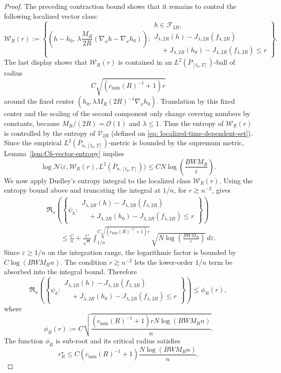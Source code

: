 \documentclass[11pt]{article}
\theoremstyle{plain}
\theoremstyle{definition}
\theoremstyle{remark}
\begin{document}
\begin{proof}
The preceding contraction bound shows that it remains to control the
following localized vector class:
\[
\mathcal W_R(r):=
\left\{
\left(h-h_0,\,
\lambda\frac{M_R}{2R}(\nabla_xh-\nabla_xh_0)\right):
\begin{array}{l}
h\in\mathcal F_{2R},\\
J_{\lambda,2R}(h)-J_{\lambda,2R}(f_{\lambda,2R})\\
\quad+J_{\lambda,2R}(h_0)-J_{\lambda,2R}(f_{\lambda,2R})\le r
\end{array}
\right\}.
\]
The last display shows that \(\mathcal W_R(r)\) is contained in an
\(L^2(\overline P_{[t_0,T]})\)-ball of radius
\[
C\sqrt{(c_{\min}(R)^{-1}+1)r}
\]
around the fixed center \((h_0,\lambda M_R(2R)^{-1}\nabla_xh_0)\). Translation
by this fixed center and the scaling of the second component only change
covering numbers by constants, because \(M_R/(2R)=\mathcal O(1)\) and
\(\lambda\le1\). Thus the entropy of \(\mathcal W_R(r)\) is controlled by
the entropy of \(\mathcal V_{2R}\) (defined on \eqref{eq: localized-time-dependent-set}). Since the empirical \(L^2(\overline P_{n,[t_0,T]})\)-metric
is bounded by the supremum metric, Lemma~\ref{lem:C6-vector-entropy} implies
\[
\log\mathcal N\bigl(\varepsilon,\mathcal W_R(r),L^2(\overline P_{n,[t_0,T]})\bigr)
\le
C N\log\left(\frac{BWM_R}{\varepsilon}\right).
\]
We now apply Dudley's entropy integral to the localized class
\(\mathcal W_R(r)\). Using the entropy bound above and truncating the
integral at \(1/n\), for \(r\gtrsim n^{-2}\), gives
\[
\begin{aligned}
&\mathfrak R_n\left(
\left\{
\psi_h:
\begin{array}{l}
J_{\lambda,2R}(h)-J_{\lambda,2R}(f_{\lambda,2R})\\
\quad+J_{\lambda,2R}(h_0)-J_{\lambda,2R}(f_{\lambda,2R})\le r
\end{array}
\right\}
\right)\\
&\qquad\le
\frac{C}{n}
+
\frac{C}{\sqrt n}
\int_{1/n}^{C\sqrt{(c_{\min}(R)^{-1}+1)r}}
\sqrt{
N\log\left(\frac{BWM_R}{\varepsilon}\right)
}
\,d\varepsilon .
\end{aligned}
\]
Since \(\varepsilon\ge 1/n\) on the integration range, the logarithmic factor
is bounded by \(C\log(BWM_R n)\). The condition \(r\gtrsim n^{-2}\) lets the
lower-order \(1/n\) term be absorbed into the integral bound. Therefore
\[
\mathfrak R_n\left(
\left\{
\psi_h:
\begin{array}{l}
J_{\lambda,2R}(h)-J_{\lambda,2R}(f_{\lambda,2R})\\
\quad+J_{\lambda,2R}(h_0)-J_{\lambda,2R}(f_{\lambda,2R})\le r
\end{array}
\right\}
\right)
\le
\phi_R(r),
\]
where
\[
\phi_R(r):=
C\sqrt{
\frac{(c_{\min}(R)^{-1}+1)rN\log(BWM_R n)}{n}
}.
\]
The function \(\phi_R\) is sub-root and its critical radius satisfies
\[
r_R^\star
\le
C(c_{\min}(R)^{-1}+1)
\frac{N\log(BWM_R n)}{n}.
\]


\end{proof}
\end{document}
